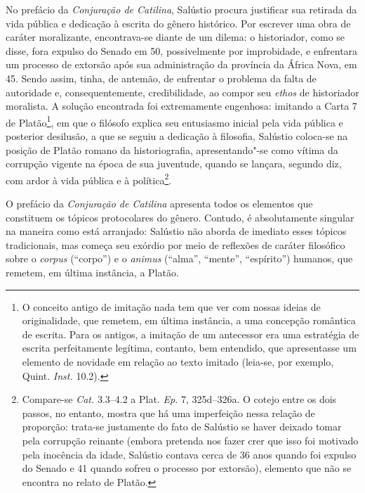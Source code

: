 No prefácio da \emph{Conjuração de Catilina}, Salústio procura justificar sua
retirada da vida pública e dedicação à escrita do gênero histórico. Por
escrever uma obra de caráter moralizante, encontrava-se diante de um dilema: o
historiador, como se disse, fora expulso do Senado em 50, possivelmente por
improbidade, e enfrentara um processo de extorsão após sua administração da
província da África Nova, em 45. Sendo assim, tinha, de antemão, de enfrentar o
problema da falta de autoridade e, consequentemente, credibilidade, ao compor seu \emph{ethos} 
de historiador moralista. A solução encontrada foi extremamente engenhosa: imitando a
Carta 7 de Platão\footnote{ O conceito antigo de imitação nada tem que ver com
nossas ideias de originalidade, que remetem, em última instância, a uma
concepção romântica de escrita. Para os antigos, a imitação de um antecessor
era uma estratégia de escrita perfeitamente legítima, contanto, bem entendido,
que apresentasse um elemento de novidade em relação ao texto imitado (leia-se, por exemplo, Quint. \emph{Inst.} 10.2).}, em que o filósofo explica seu entusiasmo
inicial pela vida pública e posterior desilusão, a que se seguiu a dedicação à
filosofia, Salústio coloca-se na posição de Platão romano da historiografia,
apresentando"-se como vítima da corrupção vigente na época de sua juventude,
quando se lançara, segundo diz, com ardor à vida pública e à política\footnote{Compare-se \emph{Cat.} 3.3--4.2 a Plat. \emph{Ep.} 7, 325d--326a. O cotejo entre os dois
passos, no entanto, mostra que há uma imperfeição nessa relação de
proporção: trata-se justamente do fato de Salústio se haver deixado tomar pela
corrupção reinante (embora pretenda nos fazer crer que isso foi motivado
pela inocência da idade, Salústio contava cerca de 36 anos quando foi
expulso do Senado e 41 quando sofreu o processo por extorsão), elemento que não se encontra no relato de Platão.}. 


O prefácio da \emph{Conjuração de Catilina} apresenta todos os elementos que
constituem os tópicos protocolares do gênero. Contudo, é absolutamente singular
na maneira como está arranjado: Salústio não aborda de imediato esses tópicos
tradicionais, mas começa seu exórdio por meio de reflexões de caráter
filosófico sobre o \emph{corpus} (“corpo”) e o \emph{animus} (``alma'', ``mente'', “espírito”)
humanos, que remetem, em última instância, a Platão. 


